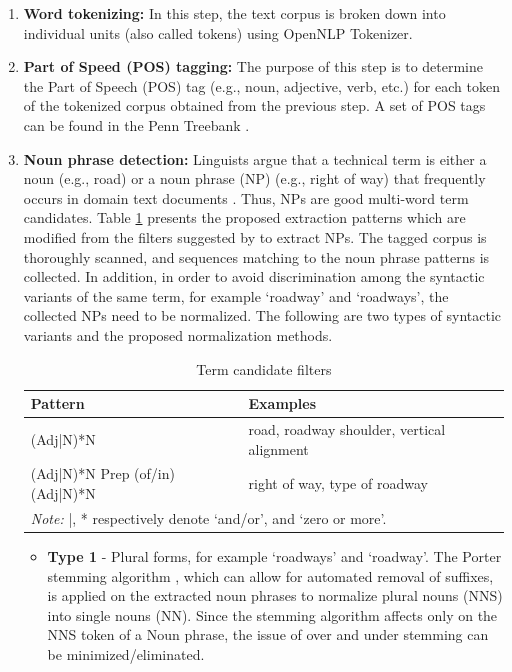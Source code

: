 \documentclass[Journal, BackFigs, DoubleSpace]{ascelike}%
\begin{document}
\begin{enumerate} [label=\roman*]
	\item \textbf{Word tokenizing:} In this step, the text corpus is broken down into individual units (also called tokens) using OpenNLP Tokenizer.
	\item \textbf{Part of Speed (POS) tagging:} The purpose of this step is to determine the Part of Speech (POS) tag (e.g., noun, adjective, verb, etc.) for each token of the tokenized corpus obtained from the previous step. A set of POS tags can be found in the Penn Treebank \cite{marcus93}.
	\item \textbf{Noun phrase detection:} Linguists argue that a technical term is either a noun (e.g., road) or a noun phrase (NP) (e.g., right of way) that frequently occurs in domain text documents \cite{justeson95}. Thus, NPs are good multi-word term candidates. Table \ref{table:term_filter} presents the proposed extraction patterns which are modified from the filters suggested by  to extract NPs. The tagged corpus is thoroughly scanned, and sequences matching to the noun phrase patterns is collected. 
	In addition, in order to avoid discrimination among the syntactic variants of the same term, for example `roadway' and `roadways', the collected NPs need to be normalized. The following are two types of syntactic variants and the proposed normalization methods.
	\begin{table} [t]
		\caption{Term candidate filters}
		\label{table:term_filter}
		\centering
		\small
		\renewcommand{\arraystretch}{1.25}
		\begin{tabular}{l l}
			\hline
			\textbf{Pattern} & \textbf{Examples}\\
			\hline
			(Adj|N)*N		& road, roadway shoulder, vertical alignment\\
			(Adj|N)*N Prep (of/in) (Adj|N)*N	&	right of way, type of roadway\\
			\hline
			\multicolumn{2}{l}{\textit{Note:} |, * respectively denote `and/or', and `zero or more'.  } \\
			\hline
		\end{tabular}
		\normalsize
	\end{table}
	\begin{itemize}
		\item \textbf{Type 1} - Plural forms, for example `roadways' and `roadway'. The Porter stemming algorithm \cite{porter80}, which can allow for automated removal of suffixes, is applied on the extracted noun phrases to normalize plural nouns (NNS) into single nouns (NN). Since the stemming algorithm affects only on the NNS token of a Noun phrase, the issue of over and under stemming can be minimized/eliminated. %

\end{itemize}
\end{enumerate}
\end{document}
